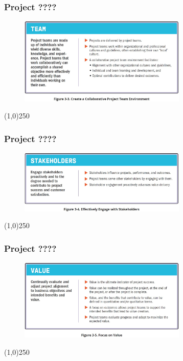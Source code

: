 \begin{frame}
\frametitle{Project ????}
 \begin{figure}
    \centering
        \includegraphics[width = 8cm]{../images/standard/Fig3-3.jpg}
    \label{standardfig:3-3}
 \end{figure}
\end{frame}
\begin{center}\line(1,0){250}\end{center}

\begin{frame}
\frametitle{Project ????}
 \begin{figure}
    \centering
        \includegraphics[width = 8cm]{../images/standard/Fig3-4.jpg}
    \label{standardfig:3-4}
 \end{figure}
\end{frame}
\begin{center}\line(1,0){250}\end{center}

\begin{frame}
\frametitle{Project ????}
 \begin{figure}
    \centering
        \includegraphics[width = 8cm]{../images/standard/Fig3-5.jpg}
    \label{standardfig:3-5}
 \end{figure}
\end{frame}
\begin{center}\line(1,0){250}\end{center}


